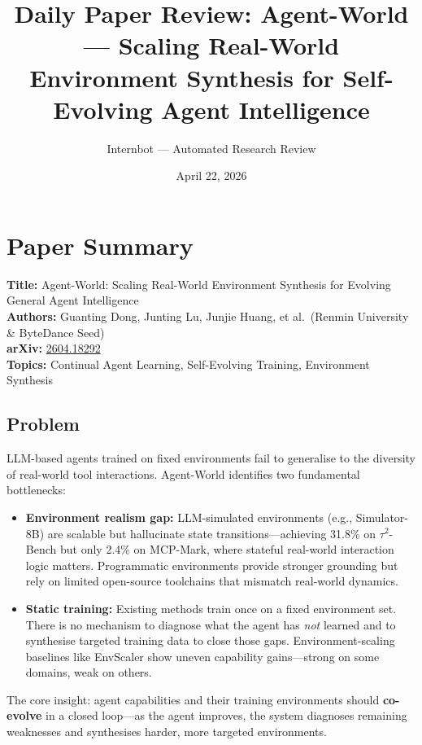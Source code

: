 \documentclass[11pt]{article}
\title{Daily Paper Review: Agent-World --- Scaling Real-World\\Environment Synthesis for Self-Evolving Agent Intelligence}
\author{Internbot --- Automated Research Review}
\date{April 22, 2026}
\begin{document}
\maketitle

\section{Paper Summary}

\textbf{Title:} Agent-World: Scaling Real-World Environment Synthesis for Evolving General Agent Intelligence \\
\textbf{Authors:} Guanting Dong, Junting Lu, Junjie Huang, et al.\ (Renmin University \& ByteDance Seed) \\
\textbf{arXiv:} \href{https://arxiv.org/abs/2604.18292}{2604.18292} \\
\textbf{Topics:} Continual Agent Learning, Self-Evolving Training, Environment Synthesis

\subsection{Problem}

LLM-based agents trained on fixed environments fail to generalise to the diversity of real-world tool interactions. Agent-World identifies two fundamental bottlenecks:

\begin{itemize}
    \item \textbf{Environment realism gap:} LLM-simulated environments (e.g., Simulator-8B) are scalable but hallucinate state transitions---achieving 31.8\% on $\tau^2$-Bench but only 2.4\% on MCP-Mark, where stateful real-world interaction logic matters. Programmatic environments provide stronger grounding but rely on limited open-source toolchains that mismatch real-world dynamics.

    \item \textbf{Static training:} Existing methods train once on a fixed environment set. There is no mechanism to diagnose what the agent has \textit{not} learned and to synthesise targeted training data to close those gaps. Environment-scaling baselines like EnvScaler show uneven capability gains---strong on some domains, weak on others.
\end{itemize}

The core insight: agent capabilities and their training environments should \textbf{co-evolve} in a closed loop---as the agent improves, the system diagnoses remaining weaknesses and synthesises harder, more targeted environments.
\end{document}
